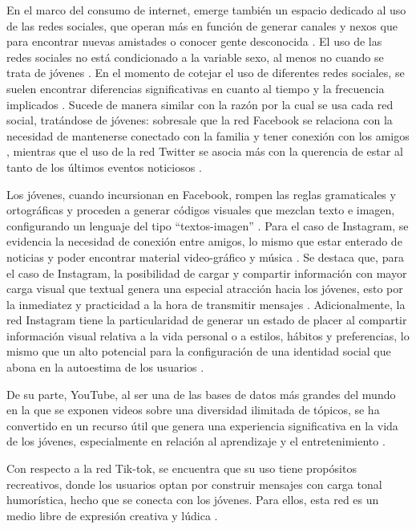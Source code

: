 \documentclass[spanish]{textolivre}
\begin{document}
En el marco del consumo de internet, emerge también un espacio dedicado al uso de las redes sociales, que operan más en función de generar canales y nexos que para encontrar nuevas amistades o conocer gente desconocida \cite{haythornthwaite2005}. El uso de las redes sociales no está condicionado a la variable sexo, al menos no cuando se trata de jóvenes \cite{rodriguez2018}. En el momento de cotejar el uso de diferentes redes sociales, se suelen encontrar diferencias significativas en cuanto al tiempo y la frecuencia implicados \cite{arcilacalderon2017, rodriguez2018}. Sucede de manera similar con la razón por la cual se usa cada red social, tratándose de jóvenes: sobresale que la red Facebook se relaciona con la necesidad de mantenerse conectado con la familia y tener conexión con los amigos \cite{arcilacalderon2017}, mientras que el uso de la red Twitter se asocia más con la querencia de estar al tanto de los últimos eventos noticiosos \cite{arcilacalderon2017, varol2020}. 

Los jóvenes, cuando incursionan en Facebook, rompen las reglas gramaticales y ortográficas y proceden a generar códigos visuales que mezclan texto e imagen, configurando un lenguaje del tipo “textos-imagen” \cite{almansa-martinez2013}. Para el caso de Instagram, se evidencia la necesidad de conexión entre amigos, lo mismo que estar enterado de noticias y poder encontrar material video-gráfico y música \cite{arcilacalderon2017, ting2015}. Se destaca que, para el caso de Instagram, la posibilidad de cargar y compartir información con mayor carga visual que textual genera una especial atracción hacia los jóvenes, esto por la inmediatez y practicidad a la hora de transmitir mensajes \cite{ting2015}. Adicionalmente, la red Instagram tiene la particularidad de generar un estado de placer al compartir información visual relativa a la vida personal o a estilos, hábitos y preferencias, lo mismo que un alto potencial para la configuración de una identidad social que abona en la autoestima de los usuarios \cite{nedra2019}.

De su parte, YouTube, al ser una de las bases de datos más grandes del mundo en la que se exponen videos sobre una diversidad ilimitada de tópicos, se ha convertido en un recurso útil que genera una experiencia significativa en la vida de los jóvenes, especialmente en relación al aprendizaje y el entretenimiento \cite{asselin2011}.

Con respecto a la red Tik-tok, se encuentra que su uso tiene propósitos recreativos, donde los usuarios optan por construir mensajes con carga tonal humorística, hecho que se conecta con los jóvenes. Para ellos, esta red es un medio libre de expresión creativa y lúdica \cite{shutsko2020, yaqi2021}.
\end{document}
